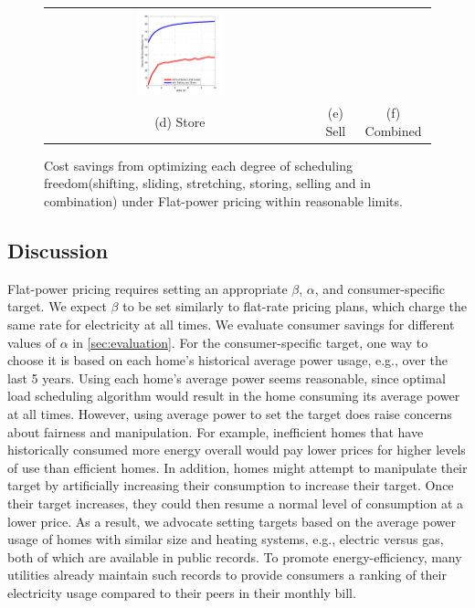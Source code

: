 \begin{figure}[t]
\begin{tabular}{ccc}
\includegraphics[width=0.33\textwidth]{graphs/combined/CombinedNew.pdf}\\
(d) Store & (e) Sell & (f) Combined\\
\end{tabular}
\vspace{0.5cm}
\caption{Cost savings from optimizing each degree of scheduling freedom(shifting, sliding, stretching, storing, selling and in combination) under Flat-power pricing within reasonable limits.}
\label{fig:newplan}
\vspace{-0.2cm}
\end{figure}

\subsection{Discussion}

Flat-power pricing requires setting an appropriate $\beta$, $\alpha$, and consumer-specific target.  We expect $\beta$ to be set similarly to flat-rate pricing plans, which charge the same rate for electricity at all times. We evaluate consumer savings for different values of $\alpha$ in \Section\ref{sec:evaluation}.  For the consumer-specific target, one way to choose it is based on each home's historical average power usage, e.g., over the last 5 years.   Using each home's average power seems reasonable, since optimal load scheduling algorithm would result in the home consuming its average power at all times.  However, using average power to set the target does raise concerns about fairness and manipulation.  For example, inefficient homes that have historically consumed more energy overall would pay lower prices for higher levels of use than efficient homes.  In addition, homes might attempt to manipulate their target by artificially increasing their consumption to increase their target.  Once their target increases, they could then resume a normal level of consumption at a lower price.  As a result, we advocate setting targets based on the average power usage of homes with similar size and heating systems, e.g., electric versus gas, both of which are available in public records.  To promote energy-efficiency, many utilities already maintain such records to provide consumers a ranking of their electricity usage compared to their peers in their monthly bill.  

